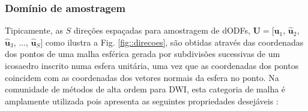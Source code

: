 \documentclass[
    12pt,                %
    oneside,            %
    a4paper,            %
    english,            %
    french,                %
    spanish,            %
    brazil                %
    ]{abntex2}
\begin{document}



\subsubsection{Domínio de amostragem}
\label{ssec::dominio_esferico}

Tipicamente, as $S$ direções espaçadas para amostragem de dODFs,
$\mathbf{U} = [
\mathbf{\hat{u}}_1$, 
$\mathbf{\hat{u}}_2$, 
$\mathbf{\hat{u}}_3$, ..., 
$\mathbf{\hat{u}}_S]$ como ilustra a Fig. \ref{fig::direcoes}, são obtidas através das coordenadas dos pontos de uma malha esférica gerada por subdivisões sucessivas de um icosaedro inscrito numa esfera unitária, uma vez que as coordenadas dos pontos coincidem com as coordenadas dos vetores normais da esfera no ponto. Na comunidade de métodos de alta ordem para DWI, esta categoria de malha é amplamente utilizada \cite{yeh2010, TuchQBall2004, descoteaux2007} pois apresenta as seguintes propriedades desejáveis  \cite{popko2012}:
\end{document}
